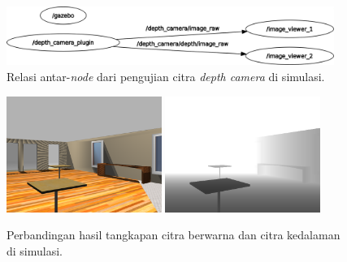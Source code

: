 
\begin{figure}[ht]
  \centering
  \includegraphics[width=0.95\textwidth,keepaspectratio]{gambar/rosgraph-depth-camera-plugin.png}
  \caption{Relasi antar-\emph{node} dari pengujian citra \emph{depth camera} di simulasi.}
  \label{fig:rosgraphdepthcameraplugin}
\end{figure}


\begin{figure}[ht]
  \centering
  \includegraphics[width=0.45\textwidth,keepaspectratio]{gambar/citra-depth-camera-rgb-simulasi.png}
  \includegraphics[width=0.45\textwidth,keepaspectratio]{gambar/citra-depth-camera-depth-simulasi.png}
  \caption{Perbandingan hasil tangkapan citra berwarna dan citra kedalaman di simulasi.}
  \label{fig:depthcamerasimulasi}
\end{figure}
